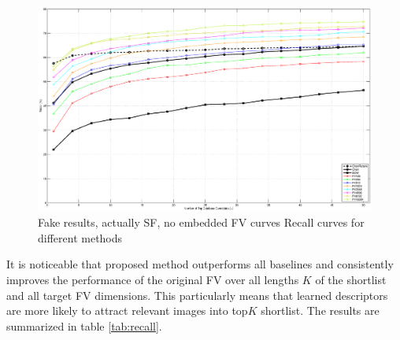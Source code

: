 \documentclass[table]{article} %
\begin{document}
		\begin{figure}
		\centering
		\includegraphics[width=\linewidth]{evaluationWOWplot}	
		\caption{
			\textcolor{myRed}{Fake results, actually SF, no embedded FV curves}
			Recall curves for different methods
		}
		\label{fig:recall}
		\end{figure}

		It is noticeable that proposed method outperforms all baselines and consistently improves the performance of the original FV over all lengths $K$ of the shortlist and all target FV dimensions. This particularly means that learned descriptors are more likely to attract relevant images into top$K$ shortlist. The results are summarized in table \ref{tab:recall}.
\end{document}
